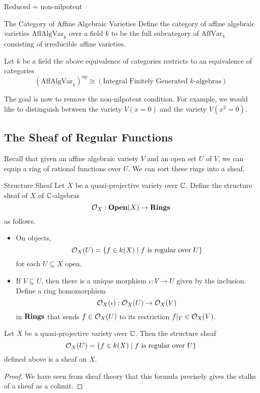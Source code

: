 \documentclass[a4paper]{article}
\begin{document}
Reduced = non-nilpotent

\begin{defn}{The Category of Affine Algebraic Varieties}{} Define the category of affine algebraic varieties $\text{AffAlgVar}_k$ over a field $k$ to be the full subcategory of $\text{AffVar}_k$ consisting of irreducible affine varieties. 
\end{defn}

\begin{prp}{}{} Let $k$ be a field the above equivalence of categories restricts to an equivalence of categories $$(\text{AffAlgVar}_k)^\text{op}\cong(\text{Integral Finitely Generated }k\text{-algebras})$$
\end{prp}

The goal is now to remove the non-nilpotent condition. For example, we would like to distinguish between the variety $V(x=0)$ and the variety $V(x^2=0)$. 

\subsection{The Sheaf of Regular Functions}
Recall that given an affine algebraic variety $V$ and an open set $U$ of $V$, we can equip a ring of rational functions over $U$. We can sort these rings into a sheaf. 

\begin{defn}{Structure Sheaf}{} Let $X$ be a quasi-projective variety over $\mathbb{C}$. Define the structure sheaf of $X$ of $\mathbb{C}$-algebras $$\mathcal{O}_X:\bold{Open}(X)\to\bold{Rings}$$ as follows. 
\begin{itemize}
\item On objects, $$\mathcal{O}_X(U)=\{f\in k(X)\;|\;f\text{ is regular over }U\}$$ for each $U\subseteq X$ open. 
\item If $V\subseteq U$, then there is a unique morphism $\iota:V\to U$ given by the inclusion. Define a ring homomorphism $$\mathcal{O}_X(\iota):\mathcal{O}_X(U)\to\mathcal{O}_X(V)$$ in $\bold{Rings}$ that sends $f\in\mathcal{O}_X(U)$ to its restriction $f|_V\in\mathcal{O}_X(V)$. 
\end{itemize}
\end{defn}

\begin{prp}{}{} Let $X$ be a quasi-projective variety over $\mathbb{C}$. Then the structure sheaf $$\mathcal{O}_X(U)=\{f\in k(X)\;|\;f\text{ is regular over }U\}$$ defined above is a sheaf on $X$. \tcbline
\begin{proof}
We have seen from sheaf theory that this formula precisely gives the stalks of a sheaf as a colimit. 
\end{proof}
\end{prp}
\end{document}
